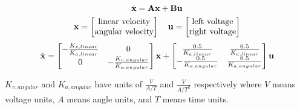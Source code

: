 \begin{theorem}
  \begin{equation*}
    \dot{\mathbf{x}} = \mathbf{A}\mathbf{x} + \mathbf{B}\mathbf{u}
  \end{equation*}
  \begin{equation*}
    \mathbf{x} =
    \begin{bmatrix}
      \text{linear velocity} \\
      \text{angular velocity}
    \end{bmatrix}
    \quad
    \mathbf{u} =
    \begin{bmatrix}
      \text{left voltage} \\
      \text{right voltage}
    \end{bmatrix}
  \end{equation*}
  \begin{equation*}
    \dot{\mathbf{x}} =
    \begin{bmatrix}
      -\frac{K_{v,linear}}{K_{a,linear}} & 0 \\
      0 & -\frac{K_{v,angular}}{K_{a,angular}}
    \end{bmatrix} \mathbf{x} +
    \begin{bmatrix}
      \frac{0.5}{K_{a,linear}} & \frac{0.5}{K_{a,linear}} \\
      -\frac{0.5}{K_{a,angular}} & \frac{0.5}{K_{a,angular}}
    \end{bmatrix} \mathbf{u}
  \end{equation*}

  $K_{v,angular}$ and $K_{a,angular}$ have units of $\frac{V}{A/T}$ and
  $\frac{V}{A/T^2}$ respectively where $V$ means voltage units, $A$ means angle
  units, and $T$ means time units.
\end{theorem}

